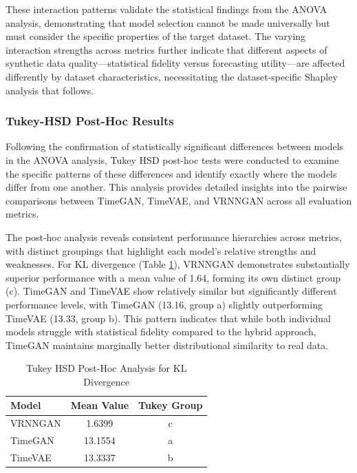 \documentclass{article}
\begin{document}
These interaction patterns validate the statistical findings from the ANOVA analysis, demonstrating that model selection cannot be made universally but must consider the specific properties of the target dataset. The varying interaction strengths across metrics further indicate that different aspects of synthetic data quality—statistical fidelity versus forecasting utility—are affected differently by dataset characteristics, necessitating the dataset-specific Shapley analysis that follows.


\subsubsection{Tukey-HSD Post-Hoc Results}

Following the confirmation of statistically significant differences between models in the ANOVA analysis, Tukey HSD post-hoc tests were conducted to examine the specific patterns of these differences and identify exactly where the models differ from one another. This analysis provides detailed insights into the pairwise comparisons between TimeGAN, TimeVAE, and VRNNGAN across all evaluation metrics.

The post-hoc analysis reveals consistent performance hierarchies across metrics, with distinct groupings that highlight each model's relative strengths and weaknesses. For KL divergence (Table \ref{tab:tukey_kl}), VRNNGAN demonstrates substantially superior performance with a mean value of 1.64, forming its own distinct group (c). TimeGAN and TimeVAE show relatively similar but significantly different performance levels, with TimeGAN (13.16, group a) slightly outperforming TimeVAE (13.33, group b). This pattern indicates that while both individual models struggle with statistical fidelity compared to the hybrid approach, TimeGAN maintains marginally better distributional similarity to real data.
\begin{table}[H]
\centering
\caption{Tukey HSD Post-Hoc Analysis for KL Divergence}
\label{tab:tukey_kl}
\begin{tabular}{lcc}
\toprule
\textbf{Model} & \textbf{Mean Value} & \textbf{Tukey Group} \\
\midrule
VRNNGAN & 1.6399 & c \\
TimeGAN & 13.1554 & a \\
TimeVAE & 13.3337 & b \\
\bottomrule
\end{tabular}
\footnotesize
\end{table}
\end{document}
